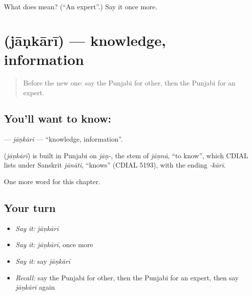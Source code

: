 \begin{tcolorbox}[breakable,colback=teal!4,colframe=teal!35!black,title={Before you move on}]
What does  mean? (\textquotedblleft{}An expert\textquotedblright{}.) Say it once more.
\end{tcolorbox}
\section[\texorpdfstring{\pa{ਜਾਣਕਾਰੀ} (jāṇkārī)}{ਜਾਣਕਾਰੀ (jāṇkārī)}]{ (jāṇkārī) — knowledge, information}

\label{lesson:PA-C109-jankari}



\begin{quote}
Before the new one: say the Punjabi for other, then the Punjabi for an expert.
\end{quote}

\subsection*{You'll want to know: }
\textbf{} — \emph{jāṇkārī} — \textquotedblleft{}knowledge, information\textquotedblright{}.

\begin{cousinweb}
\textbf{} (\emph{jāṇkārī}) is built in Punjabi on \emph{jāṇ-}, the stem of \emph{jāṇnā}, \textquotedblleft{}to know\textquotedblright{}, which CDIAL lists under Sanskrit \emph{jānāti}, \textquotedblleft{}knows\textquotedblright{} (CDIAL 5193), with the ending \emph{-kārī}.
\end{cousinweb}

\begin{grammarlens}[title={What you've built}]
One more word for this chapter.
\end{grammarlens}

\subsection*{Your turn}
\begin{itemize}
\raggedright
  \item \emph{Say it:} \emph{jāṇkārī}
  \item \emph{Say it:} \emph{jāṇkārī}, once more
  \item \emph{Say it:} say \emph{jāṇkārī}
  \item \emph{Recall:} say the Punjabi for other, then the Punjabi for an expert, then say \emph{jāṇkārī} again
\end{itemize}

